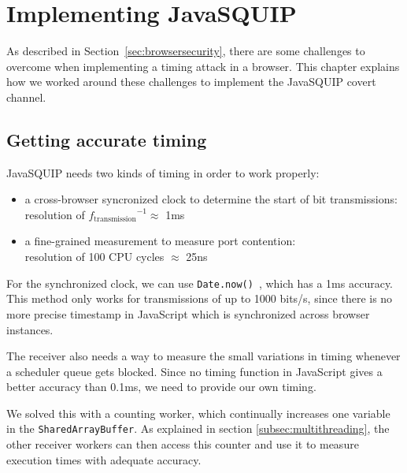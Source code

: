 \documentclass[11pt,
  titlepage=false,
]{scrreprt}
\begin{document}
\chapter{Implementing JavaSQUIP}
\label{ch:implementation}
As described in Section~\ref{sec:browsersecurity}, there are some challenges to overcome when implementing a timing attack in a browser.
This chapter explains how we worked around these challenges to implement the JavaSQUIP covert channel.

\section{Getting accurate timing}
\label{sec:accurate-timing}
JavaSQUIP needs two kinds of timing in order to work properly:
\begin{itemize}
    \item a cross-browser syncronized clock to determine the start of bit transmissions:\\
    resolution of ${f_{\text{transmission}}}^{-1} \approx$ 1ms
    \item a fine-grained measurement to measure port contention:\\
    resolution of 100 CPU cycles $\approx$ 25ns
\end{itemize}

For the synchronized clock, we can use \texttt{Date.now()}~\cite{datenow}, which has a 1ms accuracy.
This method only works for transmissions of up to 1000 bits/s, since there is no more precise timestamp in JavaScript which is synchronized across browser instances.


The receiver also needs a way to measure the small variations in timing whenever a scheduler queue gets blocked.
Since no timing function in JavaScript gives a better accuracy than 0.1ms, we need to provide our own timing.

We solved this with a counting worker, which continually increases one variable in the \texttt{SharedArrayBuffer}.
As explained in section \ref{subsec:multithreading}, the other receiver workers can then access this counter and use it to measure execution times with adequate accuracy.
\end{document}

